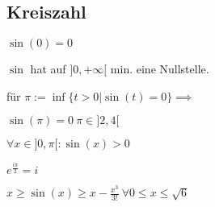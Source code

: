 \subsection{Kreiszahl}
\begin{compactitem}
    \item $\sin(0) = 0$
    \item $\sin$ hat auf $]0, +\infty[$ min. eine Nullstelle.
    \item für $\pi := \inf \{t > 0 | \sin(t) = 0\} \implies$
        \begin{compactenum}
            \item $\sin(\pi) = 0 \ \pi \in ]2, 4[$
            \item $\forall x \in ]0, \pi[ : \sin(x) > 0$
            \item $e^{\frac{i\pi}{2}} = i$
        \end{compactenum}
    \item $x \ge \sin(x) \ge x - \frac{x^3}{3!} \ \forall 0 \le x \le \sqrt{6}$
\end{compactitem}

